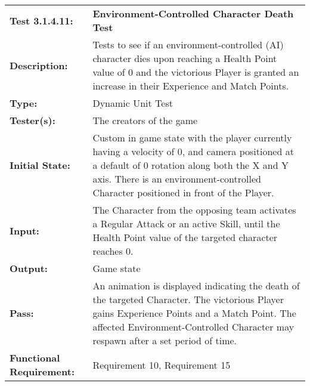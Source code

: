 \documentclass[12pt, titlepage]{article}
\begin{document}
\begin{mdframed}[linewidth=1pt]
\begin{tabularx}{\textwidth}{@{}p{3cm}X@{}}
{\bf Test 3.1.4.11:} & {\bf Environment-Controlled Character Death Test}\\[\baselineskip]
{\bf Description:} & Tests to see if an environment-controlled (AI) character dies upon reaching a Health Point value of 0 and the victorious Player is granted an increase in their Experience and Match Points. \\[0.5\baselineskip]
{\bf Type:} & Dynamic Unit Test\\[0.5\baselineskip]
{\bf Tester(s):} & The creators of the game\\[0.5\baselineskip]
{\bf Initial State:} & Custom in game state with the player currently having a velocity of 0, and camera positioned at a default of 0 rotation along both the X and Y axis. There is an environment-controlled Character  positioned in front of the Player. \\[0.5\baselineskip]
{\bf Input:} & The Character from the opposing team activates a Regular Attack or an active Skill, until the Health Point value of the targeted character reaches 0. \\[0.5\baselineskip]
{\bf Output:} & Game state\\[0.5\baselineskip]
{\bf Pass:} & An animation is displayed indicating the death of the targeted Character. The victorious Player gains Experience Points and a Match Point. The affected Environment-Controlled Character may respawn after a set period of time. \\[0.5\baselineskip]
{\bf Functional Requirement:} & Requirement 10, Requirement 15
\end{tabularx}
\end{mdframed}
\end{document}
